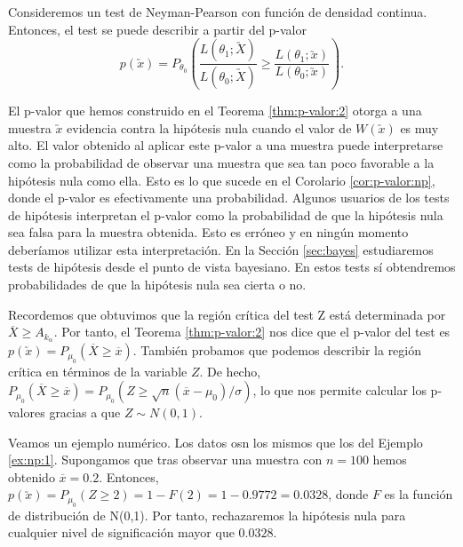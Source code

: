         \begin{cor} \label{cor:p-valor:np}
            Consideremos un test de Neyman-Pearson con función de densidad continua. Entonces, el test se puede describir a partir del p-valor
           \[p(\utilde{x}) = P_{\theta_0}\left(\frac{L(\theta_1;\utilde{X})}{L(\theta_0;\utilde{X})} \ge \frac{L(\theta_1;\utilde{x})}{L(\theta_0;\utilde{x})}\right).\]
       \end{cor}

        El p-valor que hemos construido en el Teorema \ref{thm:p-valor:2} otorga a una muestra $\utilde{x}$ evidencia contra la hipótesis nula cuando el valor de $W(\utilde{x})$ es muy alto. El valor obtenido al aplicar este p-valor a una muestra puede interpretarse como la probabilidad de observar una muestra que sea tan poco favorable a la hipótesis nula como ella. Esto es lo que sucede en el Corolario \ref{cor:p-valor:np}, donde el p-valor es efectivamente una probabilidad. Algunos usuarios de los tests de hipótesis interpretan el p-valor como la probabilidad de que la hipótesis nula sea falsa para la muestra obtenida. Esto es erróneo y en ningún momento deberíamos utilizar esta interpretación. En la Sección \ref{sec:bayes} estudiaremos tests de hipótesis desde el punto de vista bayesiano. En estos tests sí obtendremos probabilidades de que la hipótesis nula sea cierta o no.

        \begin{ex}
            Recordemos que obtuvimos que la región crítica del test Z está determinada por $\overline{X} \ge A_{k_\alpha}$. Por tanto, el Teorema \ref{thm:p-valor:2} nos dice que el p-valor del test es $p(\utilde{x}) = P_{\mu_0}(\overline{X} \ge \overline{x})$. También probamos que podemos describir la región crítica en términos de la variable $Z$. De hecho, $P_{\mu_0}(\overline{X} \ge \overline{x}) = P_{\mu_0}(Z \ge \sqrt{n}(\overline{x} - \mu_0)/\sigma)$, lo que nos permite calcular los p-valores gracias a que $Z \sim N(0,1)$.

            Veamos un ejemplo numérico. Los datos osn los mismos que los del Ejemplo \ref{ex:np:1}. Supongamos que tras observar una muestra con $n = 100$ hemos obtenido $\overline{x} = 0.2$. Entonces, $p(\utilde{x}) = P_{\mu_0}(Z \ge 2) = 1 - F(2) = 1 - 0.9772 = 0.0328$, donde $F$ es la función de distribución de N(0,1). Por tanto, rechazaremos la hipótesis nula para cualquier nivel de significación mayor que $0.0328$.
        \end{ex}

